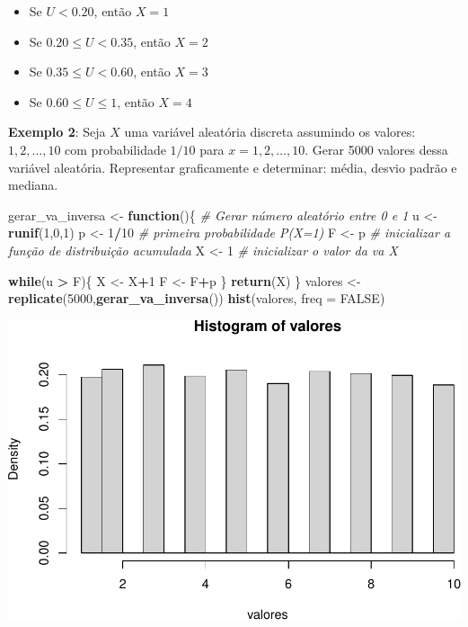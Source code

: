 \documentclass[
]{book}
\newenvironment{Shaded}{\begin{snugshade}}{\end{snugshade}}
\newcommand{\AttributeTok}[1]{\textcolor[rgb]{0.13,0.29,0.53}{#1}}
\newcommand{\CommentTok}[1]{\textcolor[rgb]{0.56,0.35,0.01}{\textit{#1}}}
\newcommand{\ConstantTok}[1]{\textcolor[rgb]{0.56,0.35,0.01}{#1}}
\newcommand{\ControlFlowTok}[1]{\textcolor[rgb]{0.13,0.29,0.53}{\textbf{#1}}}
\newcommand{\DecValTok}[1]{\textcolor[rgb]{0.00,0.00,0.81}{#1}}
\newcommand{\FunctionTok}[1]{\textcolor[rgb]{0.13,0.29,0.53}{\textbf{#1}}}
\newcommand{\NormalTok}[1]{#1}
\newcommand{\OtherTok}[1]{\textcolor[rgb]{0.56,0.35,0.01}{#1}}
\newcommand{\SpecialCharTok}[1]{\textcolor[rgb]{0.81,0.36,0.00}{\textbf{#1}}}
\providecommand{\tightlist}{%
  \setlength{\itemsep}{0pt}\setlength{\parskip}{0pt}}
\begin{document}
\begin{itemize}
\tightlist
\item
  Se \(U <0.20\), então \(X=1\)
\item
  Se \(0.20 \leq U < 0.35\), então \(X=2\)
\item
  Se \(0.35\leq U < 0.60\), então \(X=3\)
\item
  Se \(0.60 \leq U \leq 1\), então \(X=4\)
\end{itemize}

\textbf{Exemplo 2}: Seja \(X\) uma variável aleatória discreta assumindo os
valores: \(1,2,\ldots,10\) com probabilidade \(1/10\) para
\(x=1,2,\ldots,10\). Gerar 5000 valores dessa variável aleatória.
Representar graficamente e determinar: média, desvio padrão e mediana.

\begin{Shaded}
\begin{Highlighting}[]
\NormalTok{gerar\_va\_inversa }\OtherTok{\textless{}{-}} \ControlFlowTok{function}\NormalTok{()\{}
  \CommentTok{\# Gerar número aleatório entre 0 e 1}
\NormalTok{  u }\OtherTok{\textless{}{-}} \FunctionTok{runif}\NormalTok{(}\DecValTok{1}\NormalTok{,}\DecValTok{0}\NormalTok{,}\DecValTok{1}\NormalTok{)}
\NormalTok{  p }\OtherTok{\textless{}{-}} \DecValTok{1}\SpecialCharTok{/}\DecValTok{10} \CommentTok{\# primeira probabilidade P(X=1)}
\NormalTok{  F }\OtherTok{\textless{}{-}}\NormalTok{ p }\CommentTok{\# inicializar a função de distribuição acumulada}
\NormalTok{  X }\OtherTok{\textless{}{-}} \DecValTok{1} \CommentTok{\# inicializar o valor da va X}
  
  \ControlFlowTok{while}\NormalTok{(u }\SpecialCharTok{\textgreater{}}\NormalTok{ F)\{}
\NormalTok{    X }\OtherTok{\textless{}{-}}\NormalTok{ X}\SpecialCharTok{+}\DecValTok{1}
\NormalTok{    F }\OtherTok{\textless{}{-}}\NormalTok{ F}\SpecialCharTok{+}\NormalTok{p}
\NormalTok{  \}}
  \FunctionTok{return}\NormalTok{(X)}
\NormalTok{\}}
\NormalTok{valores }\OtherTok{\textless{}{-}} \FunctionTok{replicate}\NormalTok{(}\DecValTok{5000}\NormalTok{,}\FunctionTok{gerar\_va\_inversa}\NormalTok{())}
\FunctionTok{hist}\NormalTok{(valores, }\AttributeTok{freq =} \ConstantTok{FALSE}\NormalTok{)}
\end{Highlighting}
\end{Shaded}

\includegraphics{introR_files/figure-latex/unnamed-chunk-277-1.pdf}
\end{document}
